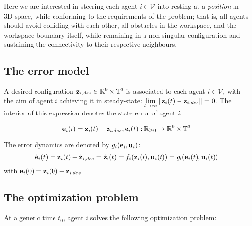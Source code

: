 Here we are interested in steering each agent $i \in \mathcal{V}$ into
resting at a \textit{position} in 3D space, while conforming to the requirements
of the problem; that is, all agents should avoid colliding with each other, all
obstacles in the workspace, and the workspace boundary itself, while remaining
in a non-singular configuration and sustaining the connectivity to their
respective neighbours.


\subsection{The error model}

A desired configuration $\bm{\mathbf{z}}_{i,des} \in \mathbb{R}^9 \times \mathbb{T}^3$
is associated to each agent $i \in \mathcal{V}$, with the aim of agent $i$
achieving it in steady-state:
$\lim\limits_{t \to \infty} \|\bm{\mathbf{z}}_i(t) - \bm{\mathbf{z}}_{i,des}\| = 0$. The
interior of this expression denotes the state error of agent $i$:

$$\bm{\mathbf{e}}_i(t) = \bm{\mathbf{z}}_i(t) - \bm{\mathbf{z}}_{i,des}, \bm{\mathbf{e}}_i(t) :
\mathbb{R}_{\geq 0} \to \mathbb{R}^9 \times \mathbb{T}^3$$

The error dynamics are denoted by $g_i(\bm{\mathbf{e}}_i, \bm{\mathbf{u}}_i)$:
\begin{align}
  \dot{\bm{\mathbf{e}}}_i(t) = \dot{\bm{\mathbf{z}}}_i(t) - \dot{\bm{\mathbf{z}}}_{i,des} =
  \dot{\bm{\mathbf{z}}}_i(t) = f_i(\bm{\mathbf{z}}_i(t), \bm{\mathbf{u}}_i(t)) = g_i(\bm{\mathbf{e}}_i(t), \bm{\mathbf{u}}_i(t))
  \label{eq:position_based_error_model}
\end{align}
with $\bm{\mathbf{e}}_i(0) = \bm{\mathbf{z}}_i(0) - \bm{\mathbf{z}}_{i,des}$


\subsection{The optimization problem}

At a generic time $t_0$, agent $i$ solves the following optimization problem:

